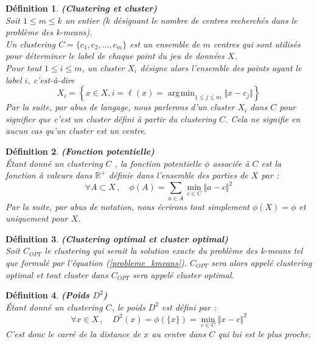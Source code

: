 \documentclass[12pt,a4paper]{book}
\newtheorem{env_definition}{Définition}
\newcommand{\R}{\mathbb{R}}
\newcommand{\1}{\mathds{1}}
\DeclareMathOperator*{\argmin}{arg\!\min}
\begin{document}
	\begin{env_definition}\label{clustering}
		\textbf{(Clustering et cluster)}\\
		Soit $ 1 \leq m \leq k$ un entier ($k$ désignant le nombre de centres recherchés dans le problème des k-means). \\
		
		\noindent Un clustering $C = \{ c_1, c_2, ..., c_m \}$ est un ensemble de $m$ centres qui sont utilisés pour déterminer le label de chaque point du jeu de données $X$. \\
		
		\noindent Pour tout $1 \leq i \leq m$, un cluster $X_i$ désigne alors l'ensemble des points ayant le label $i$, c'est-à-dire
		$$
			X_i = \left\{ x \in X, i = \ell(x) = \argmin_{1 \leq j \leq m} \Vert x - c_j \Vert \right\}
		$$
		Par la suite, par abus de langage, nous parlerons d'un cluster $X_i$ dans $C$ pour signifier que c'est un cluster défini à partir du clustering $C$. Cela ne signifie en aucun cas qu'un cluster est un centre.  
	\end{env_definition}
	
	\begin{env_definition}\label{fonction_potentielle}
		\textbf{(Fonction potentielle)}\\
		Étant donné un clustering $C$ , la fonction potentielle $\phi$ associée à $C$ est la fonction à valeurs dans $\R^+$ définie dans l'ensemble des parties de $X$ par :
		$$
			\forall A \subset X \,, \quad \phi(A) = \sum_{a \in A} \min_{c \in C} \Vert a - c \Vert^2
		$$
		Par la suite, par abus de notation, nous écrirons tout simplement $\phi(X) = \phi$ et uniquement pour $X$.
	\end{env_definition}
	
	\begin{env_definition}\label{clustering_optimal}
		\textbf{(Clustering optimal et cluster optimal)}\\
		Soit $C_{OPT}$ le clustering qui serait la solution exacte du problème des k-means tel que formulé par l'équation (\ref{probleme_kmeans}). $C_{OPT}$ sera alors appelé clustering optimal et tout cluster dans $C_{OPT}$ sera appelé cluster optimal.
	\end{env_definition}
	
	\begin{env_definition}\label{poids_d}
		\textbf{(Poids $D^2$)}\\
		Étant donné un clustering $C$, le poids $D^2$ est défini par :
		$$
			\forall x \in X \,, \quad D^2(x) = \phi(\{x\}) = \min_{c \in C} \Vert x - c \Vert^2
		$$
		C'est donc le carré de la distance de $x$ au centre dans $C$ qui lui est le plus proche.
	\end{env_definition}
	
\end{document}
